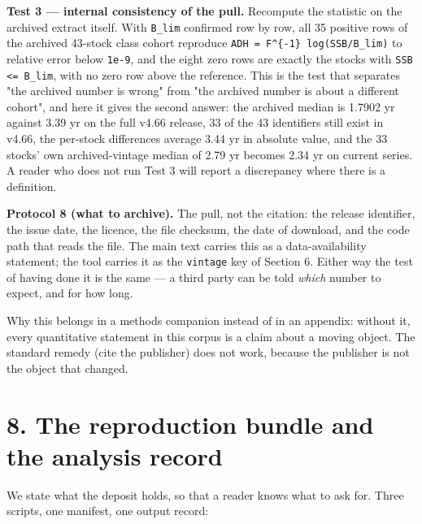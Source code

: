 \documentclass[11pt]{article}
\begin{document}
\textbf{Test 3 --- internal consistency of the pull.} Recompute the statistic on the archived extract itself. With \texttt{B\_lim} confirmed row by row, all 35 positive rows of the archived 43-stock class cohort reproduce \texttt{ADH = F\textasciicircum{}\{-\allowbreak{}1\} log(SSB/\allowbreak{}B\_lim)} to relative error below \texttt{1e-\allowbreak{}9}, and the eight zero rows are exactly the stocks with \texttt{SSB <= B\_lim}, with no zero row above the reference. This is the test that separates "the archived number is wrong" from "the archived number is about a different cohort", and here it gives the second answer: the archived median is 1.7902 yr against 3.39 yr on the full v4.66 release, 33 of the 43 identifiers still exist in v4.66, the per-stock differences average 3.44 yr in absolute value, and the 33 stocks' own archived-vintage median of 2.79 yr becomes 2.34 yr on current series. A reader who does not run Test 3 will report a discrepancy where there is a definition.

\textbf{Protocol 8 (what to archive).} The pull, not the citation: the release identifier, the issue date, the licence, the file checksum, the date of download, and the code path that reads the file. The main text carries this as a data-availability statement; the tool carries it as the \texttt{vintage} key of Section 6. Either way the test of having done it is the same --- a third party can be told \emph{which} number to expect, and for how long.

Why this belongs in a methods companion instead of in an appendix: without it, every quantitative statement in this corpus is a claim about a moving object. The standard remedy (cite the publisher) does not work, because the publisher is not the object that changed.

\vspace{0.8em}

\section*{8. The reproduction bundle and the analysis record}\label{8-the-reproduction-bundle-and-the-analysis-record}

We state what the deposit holds, so that a reader knows what to ask for. Three scripts, one manifest, one output record:
\end{document}
